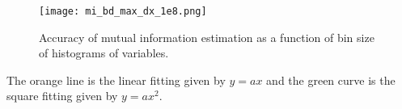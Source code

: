 \documentclass[paper=a4, fontsize=11pt]{article} %
\numberwithin{equation}{section} %
\numberwithin{figure}{section} %
\numberwithin{table}{section} %
\begin{document}
\begin{figure}[H]
	\centering
	\texttt{[image: mi\_bd\_max\_dx\_1e8.png]}
	\caption{Accuracy of mutual information estimation as a function of bin size of histograms of variables.}
	\label{fig:mi_max}
\end{figure}

The orange line is the linear fitting given by $y = ax$ and the green curve is the square fitting given by $y = ax^2$.


%
%
%
%
%
%
%
%
%
%
\end{document}
